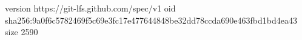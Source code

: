 version https://git-lfs.github.com/spec/v1
oid sha256:9a0f6c5782469f5c69e3fc17e477644848be32dd78ccda690e463fbd1bd4ea43
size 2590
